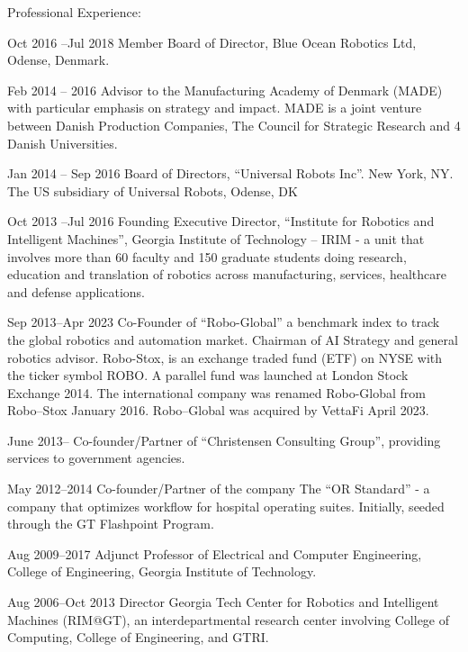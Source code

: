 \documentclass{article}
\begin{document}
\begin{cv}
\begin{cvlist}{Professional Experience:}
\item[Oct 2016 --Jul 2018] Member Board of Director, Blue Ocean Robotics Ltd,
  Odense, Denmark.

\item[Feb 2014 -- 2016] Advisor to the Manufacturing Academy of
  Denmark (MADE) with particular emphasis on strategy and impact. MADE
  is a joint venture between Danish Production Companies, The Council
  for Strategic Research and 4 Danish Universities.

\item[Jan 2014 -- Sep 2016] Board of Directors, ``Universal Robots
  Inc''. New York, NY. The US subsidiary of Universal Robots, Odense,
  DK

\item[Oct 2013 --Jul 2016] Founding Executive Director, ``Institute
  for Robotics and Intelligent Machines'', Georgia Institute of
  Technology -- IRIM - a unit that involves more than 60 faculty and
  150 graduate students doing research, education and translation of
  robotics across manufacturing, services, healthcare and defense
  applications.

\item[Sep 2013--Apr 2023] Co-Founder of ``Robo-Global'' a benchmark index to
  track the global robotics and automation market. Chairman of AI Strategy and
  general robotics advisor. Robo-Stox, is an exchange traded fund (ETF) on NYSE
  with the ticker symbol ROBO. A parallel fund was launched at London Stock
  Exchange 2014. The international company was renamed Robo-Global from
  Robo--Stox January 2016. Robo--Global was acquired by VettaFi April 2023.

\item[June 2013--] Co-founder/Partner of  ``Christensen
  Consulting Group'', providing services to government agencies.

\item[May 2012--2014] Co-founder/Partner of the company The ``OR
  Standard'' - a company that optimizes workflow for hospital
  operating suites. Initially, seeded through the GT Flashpoint
  Program.

\item[Aug 2009--2017] Adjunct Professor of Electrical and Computer
  Engineering, College of Engineering, Georgia Institute of
  Technology.

\item[Aug 2006--Oct 2013] Director Georgia Tech Center for Robotics and
  Intelligent Machines (RIM@GT), an interdepartmental research center
  involving College of Computing, College of Engineering, and GTRI.


\end{cvlist}
\end{cv}
\end{document}
